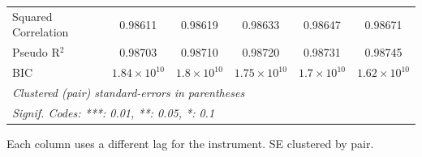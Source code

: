 \begin{table}[htbp]
\begin{tabular}{lccccc}
      Squared Correlation & 0.98611               & 0.98619              & 0.98633               & 0.98647              & 0.98671\\  
      Pseudo R$^2$        & 0.98703               & 0.98710              & 0.98720               & 0.98731              & 0.98745\\  
      BIC                 & $1.84\times 10^{10}$  & $1.8\times 10^{10}$  & $1.75\times 10^{10}$  & $1.7\times 10^{10}$  & $1.62\times 10^{10}$\\   
      \midrule \midrule
      \multicolumn{6}{l}{\emph{Clustered (pair) standard-errors in parentheses}}\\
      \multicolumn{6}{l}{\emph{Signif. Codes: ***: 0.01, **: 0.05, *: 0.1}}\\
   \end{tabular}
   
   \par \raggedright 
   Each column uses a different lag for the instrument. SE clustered by pair.
\end{table}


